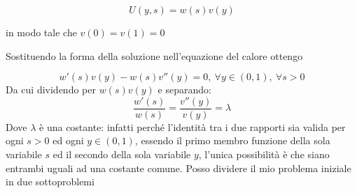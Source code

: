 \documentclass[10pt,a4paper,twoside,openright]{book}
\begin{document}
\begin{equation*}
U(y,s) =w(s) v(y)
\end{equation*}

in modo tale che $\displaystyle v(0) =v(1) =0$

Sostituendo la forma della soluzione nell'equazione del calore ottengo

\begin{equation*}
w'(s) v(y) -w(s) v'' (y) =0,\ \forall y\in (0,1),\ \forall s >0
\end{equation*}
Da cui dividendo per $\displaystyle w(s) v(y)$ e separando:
\begin{equation*}
\frac{w'(s)}{w(s)} =\frac{v'' (y)}{v(y)} =\lambda 
\end{equation*}
Dove $\displaystyle \lambda $ è una costante: infatti perché l'identità tra i due rapporti sia valida per ogni $\displaystyle s >0$ ed ogni $\displaystyle y\in (0,1)$, essendo il primo membro funzione della sola variabile $\displaystyle s$ ed il secondo della sola variabile $\displaystyle y$, l'unica possibilità è che siano entrambi uguali ad una costante comune. Posso dividere il mio problema iniziale in due sottoproblemi
\end{document}
